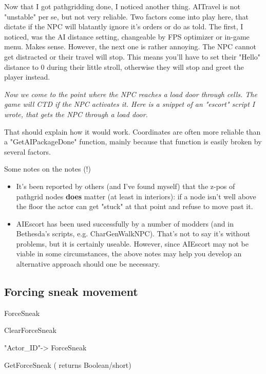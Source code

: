 Now that I got pathgridding done, I noticed another thing. AITravel is
not "unstable" per se, but not very reliable. Two factors come into play
here, that dictate if the NPC will blatantly ignore it's orders or do as
told. The first, I noticed, was the AI distance setting, changeable by
FPS optimizer or in-game menu. Makes sense. However, the next one is
rather annoying. The NPC cannot get distracted or their travel will
stop. This means you'll have to set their "Hello" distance to 0 during
their little stroll, otherwise they will stop and greet the player
instead.

\emph{\hfill\break
Now we come to the point where the NPC reaches a load door through
cells. The game will CTD if the NPC activates it. Here is a snippet of
an "escort" script I wrote, that gets the NPC through a load door.}



That should explain how it would work. Coordinates are often more
reliable than a "GetAIPackageDone" function, mainly because that
function is easily broken by several factors.

Some notes on the notes (!)

\begin{itemize}
\item
  It's been reported by others (and I've found myself) that the z-pos of
  pathgrid nodes \textbf{does} matter (at least in interiors): if a node
  isn't well above the floor the actor can get "stuck" at that point and
  refuse to move past it.
\item
  AIEscort has been used successfully by a number of modders (and in
  Bethesda's scripts, e.g. CharGenWalkNPC). That's not to say it's
  without problems, but it is certainly useable. However, since AIEscort
  may not be viable in some circumstances, the above notes may help you
  develop an alternative approach should one be necessary.
\end{itemize}

\hypertarget{forcing-sneak-movement}{%
\subsection{Forcing sneak movement}\label{forcing-sneak-movement}}

ForceSneak

ClearForceSneak

"Actor\_ID"-> ForceSneak

GetForceSneak ( returns Boolean/short)

